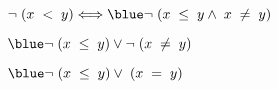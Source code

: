 \documentclass[12pt]{article}
\begin{document}
{}\vspace{0.5cm}

\begin{center}
    $\neg\hspace{0.1cm}(x\hspace{0.1cm}<\hspace{0.1cm}y)  \Longleftrightarrow \blue  \neg\hspace{0.1cm}(x\hspace{0.1cm}\leq\hspace{0.1cm}y\wedge\hspace{0.1cm}x\hspace{0.1cm}\neq\hspace{0.1cm}y)$\hspace{1cm}\vspace{1cm} 
    
   \hspace{10cm} \textup{}
\end{center}\vspace{0.5cm}

\begin{center}
    \hspace{5cm}\Longleftrightarrow \hspace{0.2cm} $\blue  \neg\hspace{0.1cm}(x\hspace{0.1cm}\leq\hspace{0.1cm}y)\vee\neg \hspace{0.1cm}(x\hspace{0.1cm}\neq\hspace{0.1cm}y) \hspace{1cm}$ \hspace{1cm} \vspace{1cm}
    
   \hspace{10cm} \textup{}
\end{center}\vspace{1cm}

\begin{center}
   \hspace{3.3cm} \Longleftrightarrow \hspace{0.2cm}$\blue \neg\hspace{0.1cm}(x\hspace{0.1cm}\leq\hspace{0.1cm}y)\vee \hspace{0.1cm}(x\hspace{0.1cm}=\hspace{0.1cm}y) \hspace{1cm}$ \hspace{1cm}
\end{center}\vspace{0.5cm}
\end{document}
